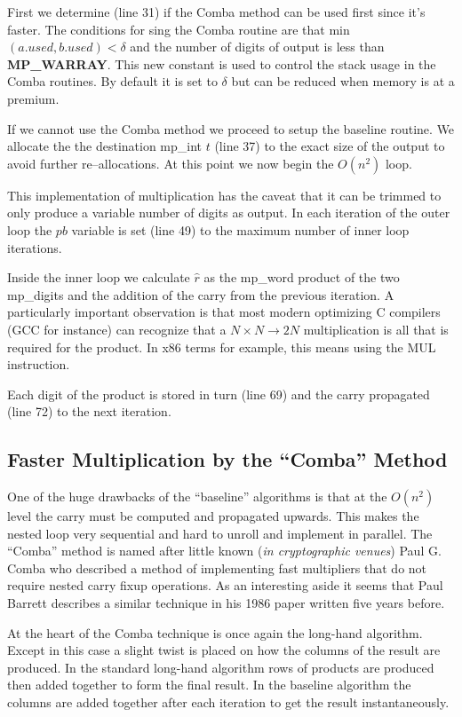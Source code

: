 \documentclass[b5paper]{book}
\begin{document}
First we determine (line 31) if the Comba method can be used first since it's faster.  The conditions for 
sing the Comba routine are that min$(a.used, b.used) < \delta$ and the number of digits of output is less than 
\textbf{MP\_WARRAY}.  This new constant is used to control the stack usage in the Comba routines.  By default it is 
set to $\delta$ but can be reduced when memory is at a premium.

If we cannot use the Comba method we proceed to setup the baseline routine.  We allocate the the destination mp\_int
$t$ (line 37) to the exact size of the output to avoid further re--allocations.  At this point we now 
begin the $O(n^2)$ loop.

This implementation of multiplication has the caveat that it can be trimmed to only produce a variable number of
digits as output.  In each iteration of the outer loop the $pb$ variable is set (line 49) to the maximum 
number of inner loop iterations.  

Inside the inner loop we calculate $\hat r$ as the mp\_word product of the two mp\_digits and the addition of the
carry from the previous iteration.  A particularly important observation is that most modern optimizing 
C compilers (GCC for instance) can recognize that a $N \times N \rightarrow 2N$ multiplication is all that 
is required for the product.  In x86 terms for example, this means using the MUL instruction.

Each digit of the product is stored in turn (line 69) and the carry propagated (line 72) to the 
next iteration.

\subsection{Faster Multiplication by the ``Comba'' Method}

One of the huge drawbacks of the ``baseline'' algorithms is that at the $O(n^2)$ level the carry must be 
computed and propagated upwards.  This makes the nested loop very sequential and hard to unroll and implement 
in parallel.  The ``Comba'' \cite{COMBA} method is named after little known (\textit{in cryptographic venues}) Paul G. 
Comba who described a method of implementing fast multipliers that do not require nested carry fixup operations.  As an 
interesting aside it seems that Paul Barrett describes a similar technique in his 1986 paper \cite{BARRETT} written 
five years before.

At the heart of the Comba technique is once again the long-hand algorithm.  Except in this case a slight 
twist is placed on how the columns of the result are produced.  In the standard long-hand algorithm rows of products 
are produced then added together to form the final result.  In the baseline algorithm the columns are added together 
after each iteration to get the result instantaneously.  
\end{document}
